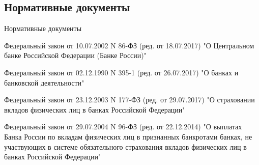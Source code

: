 \documentclass[_Banking_p2.tex]{subfiles}
\begin{document}

\subsection{Нормативные документы}

\begin{frame}[allowframebreaks]{Нормативные документы}
  \begin{thebibliography}{10}
  
  \beamertemplatearticlebibitems

Федеральный закон от 10.07.2002 N 86-ФЗ (ред. от 18.07.2017) "О Центральном банке Российской Федерации (Банке России)"

Федеральный закон от 02.12.1990 N 395-1 (ред. от 26.07.2017) "О банках и банковской деятельности"

\pagebreak

Федеральный закон от 23.12.2003 N 177-ФЗ (ред. от 29.07.2017) "О страховании вкладов физических лиц в банках Российской Федерации"

Федеральный закон от 29.07.2004 N 96-ФЗ (ред. от 22.12.2014) "О выплатах Банка России по вкладам физических лиц в признанных банкротами банках, не участвующих в системе обязательного страхования вкладов физических лиц в банках Российской Федерации"


  \end{thebibliography}
\end{frame}
\end{document}
